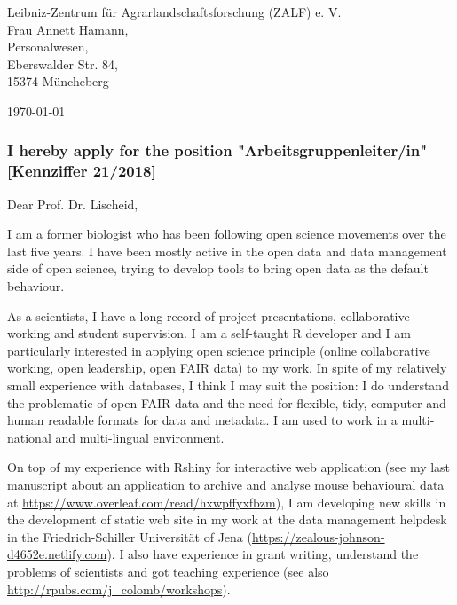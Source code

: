 \hspace*{0.5\linewidth}
\begin{minipage}{0.4\linewidth}
Leibniz-Zentrum f\"{u}r Agrarlandschaftsforschung (ZALF) e. V.\\
Frau Annett Hamann,\\ Personalwesen,\\ Eberswalder Str. 84, \\15374 M\"{u}ncheberg

\end{minipage}


\today


%
\subsubsection* {I hereby apply for the position "Arbeitsgruppenleiter/in" [Kennziffer 21/2018]
}
  

Dear  Prof. Dr. Lischeid,

I am a former biologist who has been following open science movements over the last five years. I have been mostly active in the open data and data management side of open science, trying to develop tools to bring open data as the default behaviour. 

As a scientists, I have a long record of project presentations, collaborative working and student supervision. I am a self-taught R developer and I am particularly interested in applying open science principle (online collaborative working, open leadership, open FAIR data) to my work.
In spite of my relatively small experience with databases, I think I may suit the position: I do understand the problematic of open FAIR data and the need for flexible, tidy, computer and human readable formats for data and metadata. I am used to work in a multi-national and multi-lingual environment. 

On top of my experience with Rshiny for interactive web application (see my last manuscript about an application to archive and analyse mouse behavioural data at \url{https://www.overleaf.com/read/hxwpffyxfbzm}), I am developing new skills in the development of static web site in my work at the data management helpdesk in the Friedrich-Schiller Universit\"{a}t of Jena (\url{https://zealous-johnson-d4652e.netlify.com}). I also have experience in grant writing, understand the problems of scientists and got teaching experience (see also \url{http://rpubs.com/j_colomb/workshops}).

